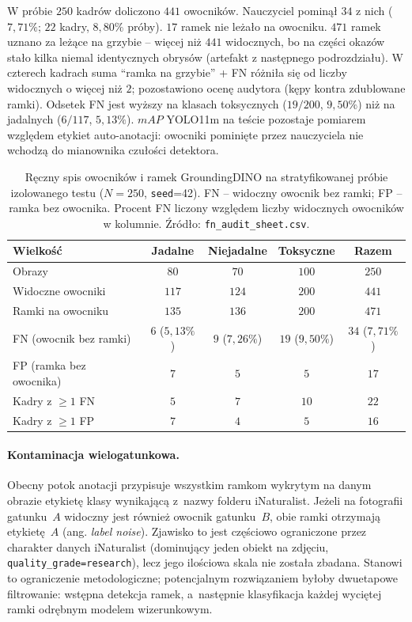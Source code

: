 W próbie $250$ kadrów doliczono $441$ owocników. Nauczyciel pominął $34$ z nich ($7{,}71\%$; $22$ kadry, $8{,}80\%$ próby). $17$ ramek nie leżało na owocniku. $471$ ramek uznano za leżące na grzybie -- więcej niż $441$ widocznych, bo na części okazów stało kilka niemal identycznych obrysów (artefakt z następnego podrozdziału). W czterech kadrach suma ``ramka na grzybie'' + FN różniła się od liczby widocznych o więcej niż $2$; pozostawiono ocenę audytora (kępy kontra zdublowane ramki). Odsetek FN jest wyższy na klasach toksycznych ($19/200$, $9{,}50\%$) niż na jadalnych ($6/117$, $5{,}13\%$). $mAP$ YOLO11m na teście pozostaje pomiarem względem etykiet auto-anotacji: owocniki pominięte przez nauczyciela nie wchodzą do mianownika czułości detektora.

\begin{table}[htbp]
 \centering
 \caption{Ręczny spis owocników i ramek GroundingDINO na stratyfikowanej próbie izolowanego testu ($N=250$, \texttt{seed}=42). FN -- widoczny owocnik bez ramki; FP -- ramka bez owocnika. Procent FN liczony względem liczby widocznych owocników w kolumnie. Źródło: \texttt{fn\_audit\_sheet.csv}.}
 \label{tab:audyt_fn}
 \begin{tabular}{|l|c|c|c|c|}
 \hline
 \textbf{Wielkość} & \textbf{Jadalne} & \textbf{Niejadalne} & \textbf{Toksyczne} & \textbf{Razem} \\
 \hline \hline
 Obrazy & $80$ & $70$ & $100$ & $250$ \\
 \hline
 Widoczne owocniki & $117$ & $124$ & $200$ & $441$ \\
 \hline
 Ramki na owocniku & $135$ & $136$ & $200$ & $471$ \\
 \hline
 FN (owocnik bez ramki) & $6$ ($5{,}13\%$) & $9$ ($7{,}26\%$) & $19$ ($9{,}50\%$) & $34$ ($7{,}71\%$) \\
 \hline
 FP (ramka bez owocnika) & $7$ & $5$ & $5$ & $17$ \\
 \hline
 Kadry z $\ge 1$ FN & $5$ & $7$ & $10$ & $22$ \\
 \hline
 Kadry z $\ge 1$ FP & $7$ & $4$ & $5$ & $16$ \\
 \hline
 \end{tabular}
\end{table}

\paragraph{Kontaminacja wielogatunkowa.}
Obecny potok anotacji przypisuje wszystkim ramkom wykrytym na danym obrazie etykietę klasy wynikającą z~nazwy folderu iNaturalist. Jeżeli na fotografii gatunku~$A$ widoczny jest również owocnik gatunku~$B$, obie ramki otrzymają etykietę~$A$ (ang. \textit{label noise}). Zjawisko to jest częściowo ograniczone przez charakter danych iNaturalist (dominujący jeden obiekt na zdjęciu, \texttt{quality\_grade=research}), lecz jego ilościowa skala nie została zbadana. Stanowi to ograniczenie metodologiczne; potencjalnym rozwiązaniem byłoby dwuetapowe filtrowanie: wstępna detekcja ramek, a~następnie klasyfikacja każdej wyciętej ramki odrębnym modelem wizerunkowym.

